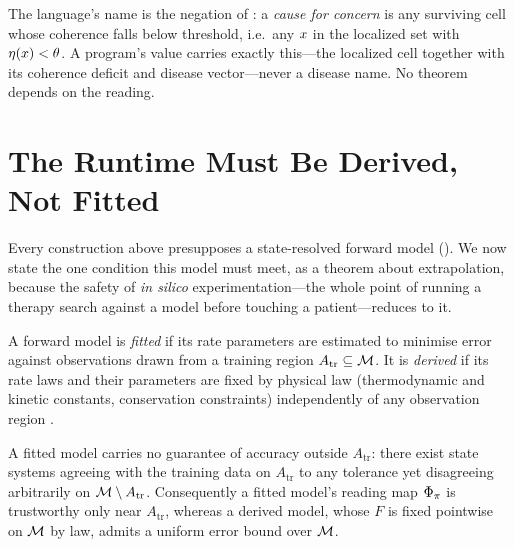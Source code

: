\begin{remark}
\label{cfc:rem:concern}
The language's name is the negation of : a
\emph{cause for concern} is any surviving cell whose coherence falls below
threshold, i.e.\ any $x$ in the localized set with $\eta(x)<\theta$. A
 program's  value carries exactly this---the localized
cell together with its coherence deficit and disease vector---never a disease
name. No theorem depends on the reading.
\end{remark}

\section{The Runtime Must Be Derived, Not Fitted}
\label{cfc:sec:runtime}

Every construction above presupposes a state-resolved forward model
(). We now state the one condition this model must
meet, as a theorem about extrapolation, because the safety of \emph{in silico}
experimentation---the whole point of running a therapy search against a model
before touching a patient---reduces to it.

\begin{definition}
\label{cfc:def:fitvsder}
A forward model is \emph{fitted} if its rate parameters are estimated to
minimise error against observations drawn from a training region
$A_{\mathrm{tr}}\subseteq\mathcal{M}$. It is \emph{derived} if its rate laws and their
parameters are fixed by physical law (thermodynamic and kinetic constants,
conservation constraints) independently of any observation region
\citep{palsson2015systems,orth2010fba}.
\end{definition}

\begin{theorem}
\label{cfc:thm:extrap}
A fitted model carries no guarantee of accuracy outside $A_{\mathrm{tr}}$:
there exist state systems agreeing with the training data on $A_{\mathrm{tr}}$
to any tolerance yet disagreeing arbitrarily on $\mathcal{M}\setminus A_{\mathrm{tr}}$.
Consequently a fitted model's reading map $\Phi_\pi$ is trustworthy only
near $A_{\mathrm{tr}}$, whereas a derived model, whose $F$ is fixed pointwise on
$\mathcal{M}$ by law, admits a uniform error bound over $\mathcal{M}$.
\end{theorem}

